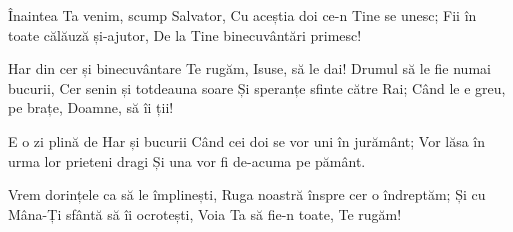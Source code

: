 \beginverse
Înaintea Ta venim, scump Salvator,
Cu aceștia doi ce-n Tine se unesc;
Fii în toate călăuză și-ajutor,
De la Tine binecuvântări primesc!
\endverse

\beginchorus
Har din cer și binecuvântare
Te rugăm, Isuse, să le dai!
Drumul să le fie numai bucurii,
Cer senin și totdeauna soare
Și speranțe sfinte către Rai;
Când le e greu, pe brațe, Doamne, să îi ții!
\endchorus

\beginverse
E o zi plină de Har și bucurii
Când cei doi se vor uni în jurământ;
Vor lăsa în urma lor prieteni dragi
Și una vor fi de-acuma pe pământ.
\endverse

\beginverse
Vrem dorințele ca să le împlinești,
Ruga noastră înspre cer o îndreptăm;
Și cu Mâna-Ți sfântă să îi ocrotești,
Voia Ta să fie-n toate, Te rugăm!
\endverse
\endsong